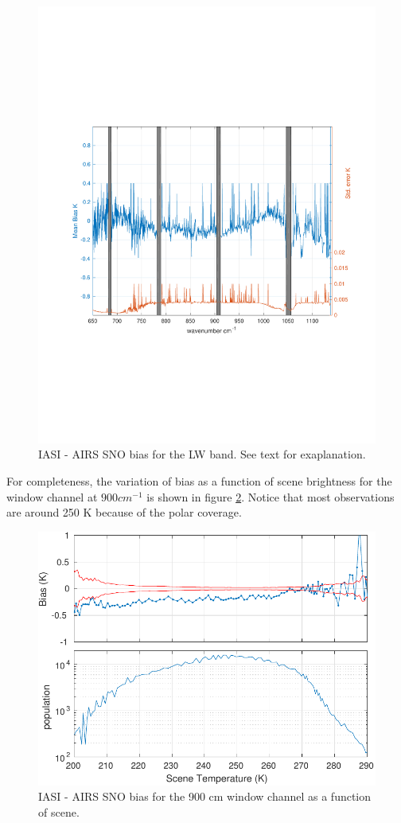 \documentclass[11pt]{article}
\begin{document}
\begin{figure}[htb]
\centering
\includegraphics[width=.66\linewidth]{./figs/fig1.pdf}
\caption{\label{fig:orgparagraph19}
  IASI - AIRS SNO bias for the LW band. See text for exaplanation.}
\label{fig:Z1}
\end{figure}

For completeness, the variation of bias as a function of scene brightness for the window channel at $ 900 cm^{-1} $ is shown in figure \ref{fig:Z2}. Notice that most observations are around 250 K because of the polar coverage.

\begin{figure}[htb]
\centering
\includegraphics[width=.6\linewidth]{./figs/AI_jplSNO_bias_std_900wn_vScene.pdf}
\caption{\label{fig:orgparagraph20}
   IASI - AIRS SNO bias for the 900 cm window channel as a function of scene.}
\label{fig:Z2}
\end{figure}
\end{document}
